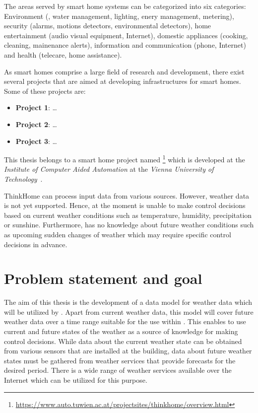 The areas served by smart home systems can be categorized into six categories: Environment (, water management, lighting, enery management, metering), security (alarms, motions detectors, environmental detectors), home entertainment (audio visual equipment, Internet), domestic appliances (cooking, cleaning, mainenance alerts), information and communication (phone, Internet) and health (telecare, home assistance).

As smart homes comprise a large field of research and development, there exist several projects that are aimed at developing infrastructures for smart homes. Some of these projects are:
\begin{itemize}
  \item \textbf{Project 1}: …
  \item \textbf{Project 2}: …
  \item \textbf{Project 3}: …
\end{itemize}

This thesis belongs to a smart home project named \thinkhome\footnote{\href{https://www.auto.tuwien.ac.at/projectsites/thinkhome/overview.html}{https://www.auto.tuwien.ac.at/projectsites/thinkhome/overview.html}} which is developed at the \emph{Institute of Computer Aided Automation} at the \emph{Vienna University of Technology}~\cite{CR2011-TH_Journal,CR2010-DEST_ThinkHome}.


ThinkHome can process input data from various sources. However, weather data is not yet supported. Hence, at the moment \thinkhome is unable to make control decisions based on current weather conditions such as temperature, humidity, precipitation or sunshine. Furthermore, \thinkhome has no knowledge about future weather conditions such as upcoming sudden changes of weather which may require specific control decisions in advance.

\section{Problem statement and goal}

The aim of this thesis is the development of a data model for weather data which will be utilized by \thinkhome. Apart from current weather data, this model will cover future weather data over a time range suitable for the use within \thinkhome. This enables \thinkhome to use current and future states of the weather as a source of knowledge for making control decisions. While data about the current weather state can be obtained from various sensors that are installed at the building, data about future weather states must be gathered from weather services that provide forecasts for the desired period. There is a wide range of weather services available over the Internet which can be utilized for this purpose.

